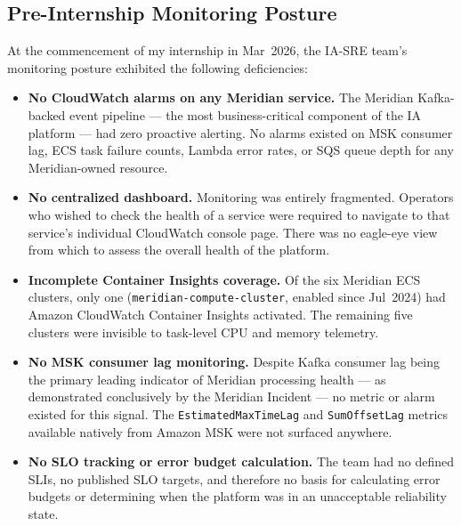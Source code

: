 \subsection{Pre-Internship Monitoring Posture}

At the commencement of my internship in Mar~2026, the IA-SRE team's
monitoring posture exhibited the following deficiencies:

\begin{itemize}
    \item \textbf{No CloudWatch alarms on any Meridian service.} The
          Meridian Kafka-backed event pipeline --- the most
          business-critical component of the IA platform --- had zero
          proactive alerting. No alarms existed on MSK consumer lag,
          ECS task failure counts, Lambda error rates, or SQS queue
          depth for any Meridian-owned resource.

    \item \textbf{No centralized dashboard.} Monitoring was entirely
          fragmented. Operators who wished to check the health of a
          service were required to navigate to that service's individual
          CloudWatch console page. There was no eagle-eye view
          from which to assess the overall health of the platform.

    \item \textbf{Incomplete Container Insights coverage.} Of the six
          Meridian ECS clusters, only one
          (\texttt{meridian-compute-cluster}, enabled since Jul~2024)
          had Amazon CloudWatch Container Insights activated. The
          remaining five clusters were invisible to task-level CPU and
          memory telemetry.

    \item \textbf{No MSK consumer lag monitoring.} Despite Kafka
          consumer lag being the primary leading indicator of Meridian
          processing health --- as demonstrated conclusively by the
          Meridian Incident --- no metric or alarm existed for this
          signal. The \texttt{EstimatedMaxTimeLag} and
          \texttt{SumOffsetLag} metrics available natively from Amazon
          MSK were not surfaced anywhere.

    \item \textbf{No SLO tracking or error budget calculation.}
          The team had no defined SLIs, no published SLO targets, and
          therefore no basis for calculating error budgets or
          determining when the platform was in an unacceptable
          reliability state.


\end{itemize}
